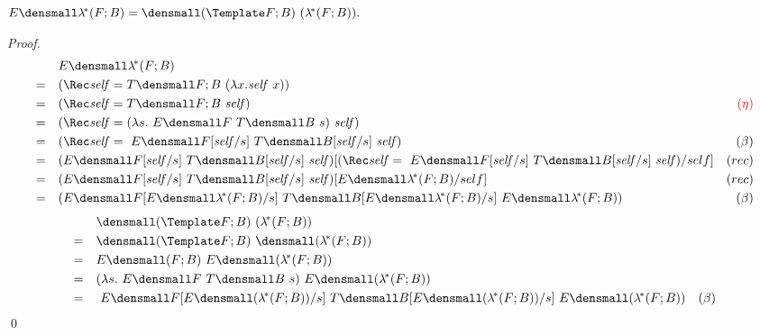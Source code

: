 \begin{theorem}
    $ E\den{ \lamstar (F; B)} = \den{(\Template F; B) ~ (\lamstar (F; B))}.$
    \begin{proof}
        \begin{align*}
            &\quad E\den{ \lamstar (F; B)} \\
            =& \quad (\Rec \mathit{self} = T\den{F; B} ~ (\lambda x. \mathit{self} ~ x)) \\
            =& \quad (\Rec \mathit{self} = T\den{F; B} ~ \mathit{self}) & \color{red}{(\eta)}\\
            =& \quad (\Rec \mathit{self} = (\lambda s. ~E\den{F} ~T\den{B} ~s) ~  \mathit{self}) \\
            =& \quad (\Rec \mathit{self} = ~E\den{F}\subst{s}{\mathit{self}} ~T\den{B}\subst{s}{\mathit{self}} ~\mathit{self}) & (\beta)\\
            =& \quad (E\den{F}\subst{s}{\mathit{self}} ~T\den{B}\subst{s}{\mathit{self}} ~\mathit{self})\subst{self}{(\Rec \mathit{self} = ~E\den{F}\subst{s}{\mathit{self}} ~T\den{B}\subst{s}{\mathit{self}} ~\mathit{self})} & (rec)\\
            =& \quad (E\den{F}\subst{s}{\mathit{self}} ~T\den{B}\subst{s}{\mathit{self}} ~\mathit{self})\subst{self}{E\den{ \lamstar (F; B)}} & (rec)\\
            =& \quad (E\den{F}\subst{s}{E\den{ \lamstar (F; B)}} ~T\den{B}\subst{s}{E\den{ \lamstar (F; B)}} ~E\den{ \lamstar (F; B)})& (\beta)
        \end{align*}
        \begin{align*}
            &\quad \den{(\Template F; B) ~ (\lamstar (F; B))} \\
            =& \quad \den{(\Template F; B)} ~\den{(\lamstar (F; B))} \\
            =& \quad E\den{(F; B)} ~E\den{(\lamstar (F; B))} \\
            =& \quad (\lambda s. ~E\den{F} ~T\den{B} ~s) ~E\den{(\lamstar (F; B))} \\
            =& \quad ~E\den{F}\subst{s}{E\den{(\lamstar (F; B))}} ~T\den{B}\subst{s}{E\den{(\lamstar (F; B))}} ~E\den{(\lamstar (F; B))}  & (\beta)
        \end{align*}
        \qed
    \end{proof}
\end{theorem}

